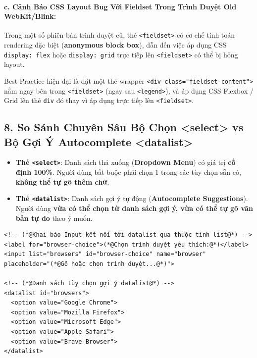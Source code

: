 \documentclass[11pt,oneside]{book}
\newcommand{\codeinline}[1]{\textcolor{accentOrange}{\texttt{#1}}}
\newcommand{\term}[1]{\textbf{\textcolor{primaryBlue}{#1}}}
\begin{document}
\paragraph{c. Cảnh Báo CSS Layout Bug Với Fieldset Trong Trình Duyệt Old WebKit/Blink:}
Trong một số phiên bản trình duyệt cũ, thẻ \codeinline{<fieldset>} có cơ chế tính toán rendering đặc biệt (\term{anonymous block box}), dẫn đến việc áp dụng CSS \codeinline{display: flex} hoặc \codeinline{display: grid} trực tiếp lên \codeinline{<fieldset>} có thể bị hỏng layout.
\begin{tipBox}
Best Practice hiện đại là đặt một thẻ wrapper \codeinline{<div class="fieldset-content">} nằm ngay bên trong \codeinline{<fieldset>} (ngay sau \codeinline{<legend>}), và áp dụng CSS Flexbox / Grid lên thẻ \codeinline{div} đó thay vì áp dụng trực tiếp lên \codeinline{<fieldset>}.
\end{tipBox}

\subsection{8. So Sánh Chuyên Sâu Bộ Chọn <select> vs Bộ Gợi Ý Autocomplete <datalist>}

\begin{conceptBox}
\begin{itemize}[leftmargin=1.5em, itemsep=3pt, parsep=0pt]
    \item \textbf{Thẻ \codeinline{<select>}}: Danh sách thả xuống (\term{Dropdown Menu}) có giá trị \textbf{cố định 100\%}. Người dùng bắt buộc phải chọn 1 trong các tùy chọn sẵn có, \textbf{không thể tự gõ thêm chữ}.
    \item \textbf{Thẻ \codeinline{<datalist>}}: Danh sách gợi ý tự động (\term{Autocomplete Suggestions}). Người dùng \textbf{vừa có thể chọn từ danh sách gợi ý, vừa có thể tự gõ văn bản tự do} theo ý muốn.
\end{itemize}
\end{conceptBox}

\begin{codeWindow}
\begin{lstlisting}[language=HTML5]
<!-- (*@Khai báo Input kết nối tới datalist qua thuộc tính list@*) -->
<label for="browser-choice">(*@Chọn trình duyệt yêu thích:@*)</label>
<input list="browsers" id="browser-choice" name="browser" placeholder="(*@Gõ hoặc chọn trình duyệt...@*)">

<!-- (*@Danh sách tùy chọn gợi ý datalist@*) -->
<datalist id="browsers">
  <option value="Google Chrome">
  <option value="Mozilla Firefox">
  <option value="Microsoft Edge">
  <option value="Apple Safari">
  <option value="Brave Browser">
</datalist>
\end{lstlisting}
\end{codeWindow}
\end{document}
